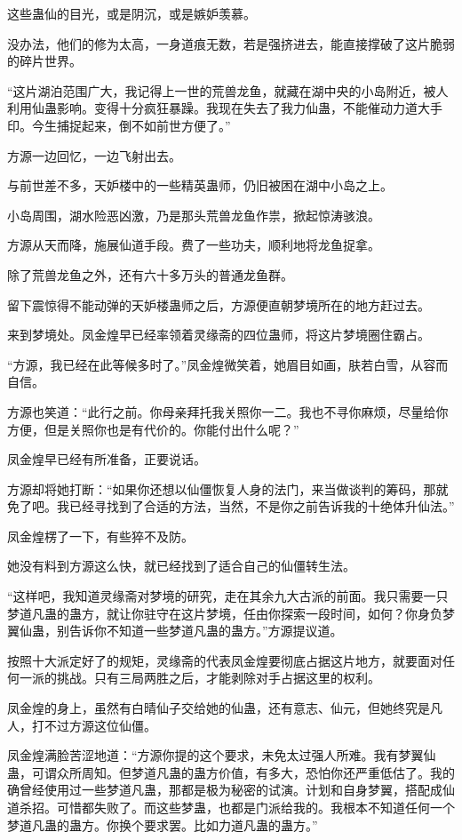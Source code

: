 \begin{this_body}
这些蛊仙的目光，或是阴沉，或是嫉妒羡慕。

没办法，他们的修为太高，一身道痕无数，若是强挤进去，能直接撑破了这片脆弱的碎片世界。

“这片湖泊范围广大，我记得上一世的荒兽龙鱼，就藏在湖中央的小岛附近，被人利用仙蛊影响。变得十分疯狂暴躁。我现在失去了我力仙蛊，不能催动力道大手印。今生捕捉起来，倒不如前世方便了。”

方源一边回忆，一边飞射出去。

与前世差不多，天妒楼中的一些精英蛊师，仍旧被困在湖中小岛之上。

小岛周围，湖水险恶凶激，乃是那头荒兽龙鱼作祟，掀起惊涛骇浪。

方源从天而降，施展仙道手段。费了一些功夫，顺利地将龙鱼捉拿。

除了荒兽龙鱼之外，还有六十多万头的普通龙鱼群。

留下震惊得不能动弹的天妒楼蛊师之后，方源便直朝梦境所在的地方赶过去。

来到梦境处。凤金煌早已经率领着灵缘斋的四位蛊师，将这片梦境圈住霸占。

“方源，我已经在此等候多时了。”凤金煌微笑着，她眉目如画，肤若白雪，从容而自信。

方源也笑道：“此行之前。你母亲拜托我关照你一二。我也不寻你麻烦，尽量给你方便，但是关照你也是有代价的。你能付出什么呢？”

凤金煌早已经有所准备，正要说话。

方源却将她打断：“如果你还想以仙僵恢复人身的法门，来当做谈判的筹码，那就免了吧。我已经寻找到了合适的方法，当然，不是你之前告诉我的十绝体升仙法。”

凤金煌楞了一下，有些猝不及防。

她没有料到方源这么快，就已经找到了适合自己的仙僵转生法。

“这样吧，我知道灵缘斋对梦境的研究，走在其余九大古派的前面。我只需要一只梦道凡蛊的蛊方，就让你驻守在这片梦境，任由你探索一段时间，如何？你身负梦翼仙蛊，别告诉你不知道一些梦道凡蛊的蛊方。”方源提议道。

按照十大派定好了的规矩，灵缘斋的代表凤金煌要彻底占据这片地方，就要面对任何一派的挑战。只有三局两胜之后，才能剥除对手占据这里的权利。

凤金煌的身上，虽然有白晴仙子交给她的仙蛊，还有意志、仙元，但她终究是凡人，打不过方源这位仙僵。

凤金煌满脸苦涩地道：“方源你提的这个要求，未免太过强人所难。我有梦翼仙蛊，可谓众所周知。但梦道凡蛊的蛊方价值，有多大，恐怕你还严重低估了。我的确曾经使用过一些梦道凡蛊，那都是极为秘密的试演。计划和自身梦翼，搭配成仙道杀招。可惜都失败了。而这些梦蛊，也都是门派给我的。我根本不知道任何一个梦道凡蛊的蛊方。你换个要求罢。比如力道凡蛊的蛊方。”


\end{this_body}
